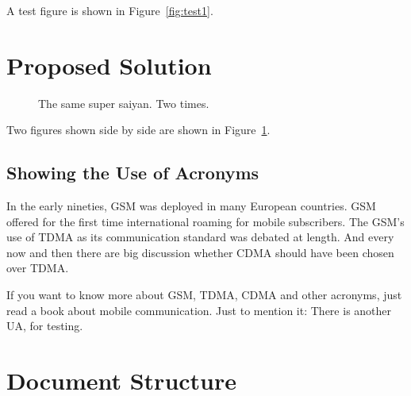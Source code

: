 A test figure is shown in Figure~\ref{fig:test1}.

\section{Proposed Solution} 

\blindtext
\blindtext

\begin{figure}[!ht]
    \centering
    \qquad
    \caption[Short Caption]{The same super saiyan. Two times.}        
    \label{fig:test2}
\end{figure}

Two figures shown side by side are shown in Figure~\ref{fig:test2}.

\subsection{Showing the Use of Acronyms}

In the early nineties, \acs{GSM} was deployed in many European countries. \ac{GSM} offered for the first time international roaming for mobile subscribers. The \acs{GSM}’s use of \ac{TDMA} as its communication standard was debated at length. And every now and then there are big discussion whether \ac{CDMA} should have been chosen over \ac{TDMA}.

If you want to know more about \acf{GSM}, \acf{TDMA}, \acf{CDMA} and other acronyms, just read a book about mobile communication. Just to mention it: There is another \ac{UA}, for testing.


\section{Document Structure}

\blindtext
